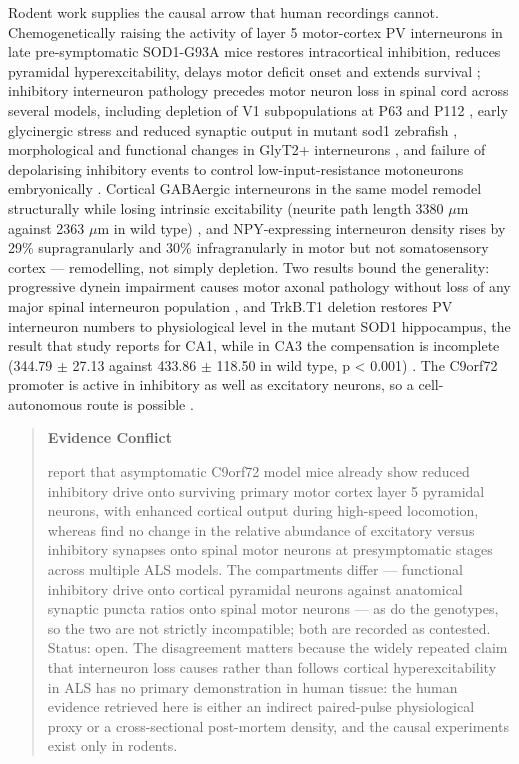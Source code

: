 \documentclass[11pt]{article}
\begin{document}
Rodent work supplies the causal arrow that human recordings cannot. Chemogenetically raising the activity of layer 5 motor-cortex PV interneurons in late pre-symptomatic SOD1-G93A mice restores intracortical inhibition, reduces pyramidal hyperexcitability, delays motor deficit onset and extends survival \citep{Khademullah2020}; inhibitory interneuron pathology precedes motor neuron loss in spinal cord across several models, including depletion of V1 subpopulations at P63 and P112 \citep{MontananaRosell2024}, early glycinergic stress and reduced synaptic output in mutant sod1 zebrafish \citep{McGown2012}, morphological and functional changes in GlyT2+ interneurons \citep{Cavarsan2023}, and failure of depolarising inhibitory events to control low-input-resistance motoneurons embryonically \citep{Zhu2024}. Cortical GABAergic interneurons in the same model remodel structurally while losing intrinsic excitability (neurite path length 3380 $\mu$m against 2363 $\mu$m in wild type) \citep{Clark2018}, and NPY-expressing interneuron density rises by 29\% supragranularly and 30\% infragranularly in motor but not somatosensory cortex \citep{Clark2017} --- remodelling, not simply depletion. Two results bound the generality: progressive dynein impairment causes motor axonal pathology without loss of any major spinal interneuron population \citep{Christoforidou2026}, and TrkB.T1 deletion restores PV interneuron numbers to physiological level in the mutant SOD1 hippocampus, the result that study reports for CA1, while in CA3 the compensation is incomplete (344.79 $\pm$ 27.13 against 433.86 $\pm$ 118.50 in wild type, p < 0.001) \citep{Quarta2018}. The C9orf72 promoter is active in inhibitory as well as excitatory neurons, so a cell-autonomous route is possible \citep{Langseth2017}.

\begin{quote}
\noindent\textbf{Evidence Conflict}\par
\citet{Amalyan2022} report that asymptomatic C9orf72 model mice already show reduced inhibitory drive onto surviving primary motor cortex layer 5 pyramidal neurons, with enhanced cortical output during high-speed locomotion, whereas \citet{Bonthron2024} find no change in the relative abundance of excitatory versus inhibitory synapses onto spinal motor neurons at presymptomatic stages across multiple ALS models. The compartments differ --- functional inhibitory drive onto cortical pyramidal neurons against anatomical synaptic puncta ratios onto spinal motor neurons --- as do the genotypes, so the two are not strictly incompatible; both are recorded as contested. Status: open. The disagreement matters because the widely repeated claim that interneuron loss causes rather than follows cortical hyperexcitability in ALS has no primary demonstration in human tissue: the human evidence retrieved here is either an indirect paired-pulse physiological proxy or a cross-sectional post-mortem density, and the causal experiments exist only in rodents.

\end{quote}
\end{document}
